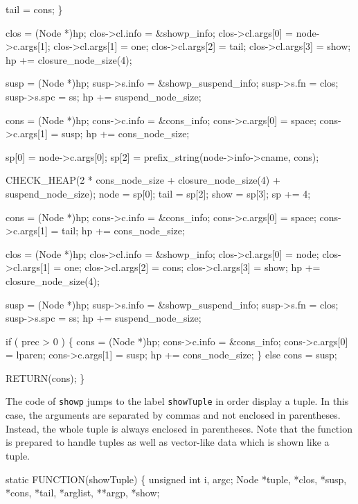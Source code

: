         tail = cons;
    \}

    clos             = (Node *)hp;
    clos->cl.info    = &showp_info;
    clos->cl.args[0] = node->c.args[1];
    clos->cl.args[1] = one;
    clos->cl.args[2] = tail;
    clos->cl.args[3] = show;
    hp              += closure_node_size(4);

    susp         = (Node *)hp;
    susp->s.info = &showp_suspend_info;
    susp->s.fn   = clos;
    susp->s.spc  = ss;
    hp          += suspend_node_size;

    cons            = (Node *)hp;
    cons->c.info    = &cons_info;
    cons->c.args[0] = space;
    cons->c.args[1] = susp;
    hp             += cons_node_size;

    sp[0] = node->c.args[0];
    sp[2] = prefix_string(node->info->cname, cons);

    CHECK_HEAP(2 * cons_node_size + closure_node_size(4) + suspend_node_size);
    node = sp[0];
    tail = sp[2];
    show = sp[3];
    sp  += 4;

    cons            = (Node *)hp;
    cons->c.info    = &cons_info;
    cons->c.args[0] = space;
    cons->c.args[1] = tail;
    hp             += cons_node_size;

    clos             = (Node *)hp;
    clos->cl.info    = &showp_info;
    clos->cl.args[0] = node;
    clos->cl.args[1] = one;
    clos->cl.args[2] = cons;
    clos->cl.args[3] = show;
    hp              += closure_node_size(4);

    susp         = (Node *)hp;
    susp->s.info = &showp_suspend_info;
    susp->s.fn   = clos;
    susp->s.spc  = ss;
    hp          += suspend_node_size;

    if ( prec > 0 )
    \{
        cons            = (Node *)hp;
        cons->c.info    = &cons_info;
        cons->c.args[0] = lparen;
        cons->c.args[1] = susp;
        hp             += cons_node_size;
    \}
    else
        cons = susp;

    RETURN(cons);
\}

\nwendcode{}\nwdocspar
The code of \texttt{showp} jumps to the label \texttt{showTuple} in
order display a tuple. In this case, the arguments are separated by
commas and not enclosed in parentheses. Instead, the whole tuple is
always enclosed in parentheses. Note that the function is prepared to
handle tuples as well as vector-like data which is shown like a
tuple.

\nwenddocs{}\plusendmoddef\nwstartdeflinemarkup{}\nwenddeflinemarkup
static
FUNCTION(showTuple)
\{
    unsigned int i, argc;
    Node         *tuple, *clos, *susp, *cons, *tail, *arglist, **argp, *show;

